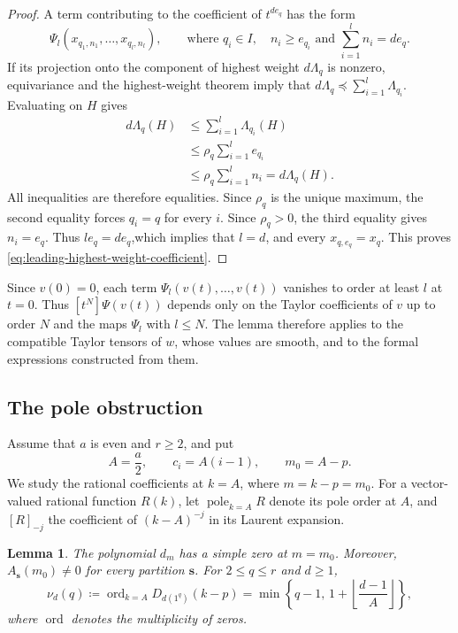 \documentclass[11pt,reqno]{amsart}
\newtheorem{lemma}[theorem]{Lemma}
\theoremstyle{corollary}
\theoremstyle{conjecture}
\theoremstyle{assumption}
\theoremstyle{proposition}
\theoremstyle{remark}
\numberwithin{equation}{section}
\begin{document}
\begin{proof}
A term contributing to the coefficient of $t^{de_q}$
has the form
\[
\Psi_l(x_{q_1,n_1},\ldots,x_{q_l,n_l}),\qquad \text{where }q_i\in I,\quad n_i\geq e_{q_i}\text{ and } \sum_{i=1}^{l}n_i=de_q.
\]
If its projection onto the component of highest weight $d\Lambda_q$ is nonzero, equivariance and the highest-weight theorem imply that $d\Lambda_q\preceq \sum_{i=1}^{l}\Lambda_{q_i}$. Evaluating on $H$ gives
\[
\begin{aligned}
d\Lambda_q(H)&\leq \sum_{i=1}^{l}\Lambda_{q_i}(H)\\
&\leq \rho_q\sum_{i=1}^{l}e_{q_i}\\
&\leq \rho_q\sum_{i=1}^{l}n_i=d\Lambda_q(H).
\end{aligned}
\]
All inequalities are therefore equalities. Since $\rho_q$ is the unique maximum, the second equality forces $q_i=q$ for every $i$. Since $\rho_q>0$, the third equality gives $n_i=e_q$. Thus $l e_q=de_q$,which implies that $l=d$, and every $x_{q,e_q}=x_q$. This proves \eqref{eq:leading-highest-weight-coefficient}.
\end{proof}

Since $v(0)=0$, each term $\Psi_l(v(t),\ldots,v(t))$ vanishes to order at least $l$ at $t=0$. Thus $[t^N]\Psi(v(t))$ depends only on the Taylor coefficients of $v$ up to order $N$ and the maps $\Psi_l$ with $l\leq N$. The lemma therefore applies to the compatible Taylor
tensors of $w$, whose values are smooth, and to the formal expressions constructed from them.

\subsection{The pole obstruction}
\label{subsec:pole-obstruction}

Assume that $a$ is even and $r\geq 2$, and put
\[
A=\frac a2,\qquad c_i=A(i-1),\qquad m_0=A-p.
\]
We study the rational coefficients at $k=A$, where $m=k-p=m_0$. For a vector-valued rational function $R(k)$, let $\operatorname{pole}_{k=A}R$ denote its pole order at $A$, and $[R]_{-j}$ the coefficient of $(k-A)^{-j}$ in its Laurent expansion.

\begin{lemma}\label{lem:polynomial-zeros}
The polynomial $d_m$ has a simple zero at $m=m_0$. Moreover, $A_{\mathbf s}(m_0)\neq 0$ for every partition $\mathbf s$. For $2\leq q\leq r$ and $d\geq1$,
\begin{equation}\label{eq:denominator-zero-order}
\nu_d(q)\coloneq\operatorname{ord}_{k=A}D_{d(1^q)}(k-p)=\min\left\{q-1,\,1+\left\lfloor\frac{d-1}{A}\right\rfloor\right\},
\end{equation}
where $\operatorname{ord}$ denotes the multiplicity of zeros.
\end{lemma}
\end{document}
